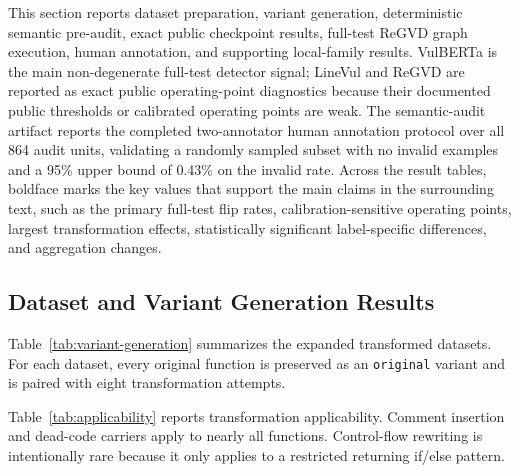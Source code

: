 \documentclass[a4paper,fleqn]{cas-dc}
\begin{document}
This section reports dataset preparation, variant generation,
deterministic semantic pre-audit, exact public checkpoint results, full-test
ReGVD graph execution, human annotation, and supporting local-family results.
VulBERTa is the main non-degenerate full-test detector signal; LineVul and
ReGVD are reported as exact public operating-point diagnostics because their
documented public thresholds or calibrated operating points are weak. The
semantic-audit artifact reports the completed two-annotator human annotation
protocol over all 864 audit units, validating a randomly sampled subset with no
invalid examples and a 95\% upper bound of 0.43\% on the invalid rate.
Across the result tables, boldface marks the key values that support the main
claims in the surrounding text, such as the primary full-test flip rates,
calibration-sensitive operating points, largest transformation effects,
statistically significant label-specific differences, and aggregation changes.

\subsection{Dataset and Variant Generation Results}

Table~\ref{tab:variant-generation} summarizes the expanded transformed
datasets. For each dataset, every original function is preserved as an
\texttt{original} variant and is paired with eight transformation attempts.

\begin{table}[t]
  \centering
  \caption{Generated transformed variants for the prepared datasets.}
  \label{tab:variant-generation}
\end{table}

Table~\ref{tab:applicability} reports transformation applicability. Comment
insertion and dead-code carriers apply to nearly all functions. Control-flow
rewriting is intentionally rare because it only applies to a restricted
returning if/else pattern.
\end{document}
